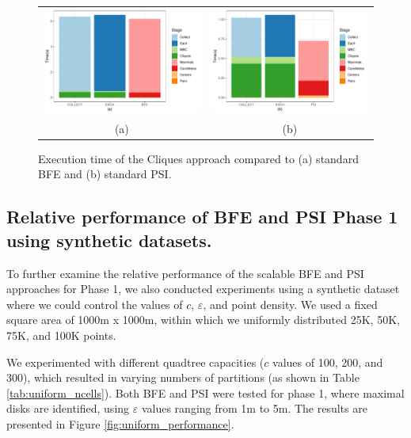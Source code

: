 \begin{figure}
    \centering
    \begin{tabular}{c c}
        \includegraphics[width=0.49\linewidth] {figures/plots/10_cmbc_variants/cmbc_bfe.pdf} &
        \includegraphics[width=0.49\linewidth] {figures/plots/10_cmbc_variants/cmbc_psi.pdf} \\
        (a) & (b) \\
    \end{tabular}
    \caption{Execution time of the Cliques approach compared to (a) standard BFE and (b) standard PSI.}\label{fig:cmbc_variants}
\end{figure}

\subsection{Relative performance of BFE and PSI Phase 1 using synthetic datasets.}
To further examine the relative performance of the scalable BFE and PSI approaches for Phase 1, we also conducted experiments using a synthetic dataset where we could control the values of $c$, $\varepsilon$, and point density. We used a fixed square area of 1000m x 1000m, within which we uniformly distributed 25K, 50K, 75K, and 100K points.

We experimented with different quadtree capacities ($c$ values of 100, 200, and 300), which resulted in varying numbers of partitions (as shown in Table \ref{tab:uniform_ncells}). Both BFE and PSI were tested for phase 1, where maximal disks are identified, using $\varepsilon$ values ranging from 1m to 5m. The results are presented in Figure \ref{fig:uniform_performance}.

